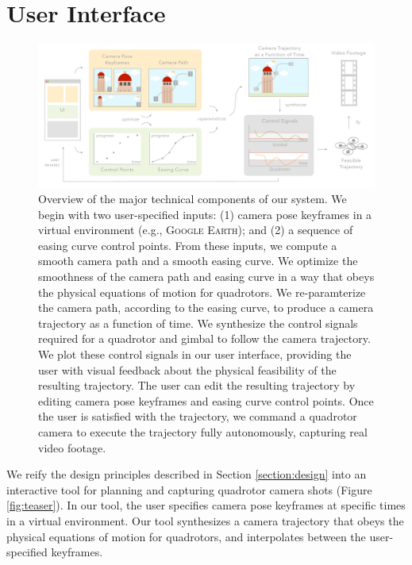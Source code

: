 \section{User Interface}
\label{section:ui}

\begin{figure}[th!]
  \centering
  \includegraphics[width=5.5in]{images/2015_siggraph_asia/system_overview}
  \caption{
Overview of the major technical components of our system.
We begin with two user-specified inputs: (1) camera pose keyframes in a virtual environment (e.g., \textsc{Google Earth}); and (2) a sequence of easing curve control points.
From these inputs, we compute a smooth camera path and a smooth easing curve.
We optimize the smoothness of the camera path and easing curve in a way that obeys the physical equations of motion for quadrotors.
We re-paramterize the camera path, according to the easing curve, to produce a camera trajectory as a function of time.
We synthesize the control signals required for a quadrotor and gimbal to follow the camera trajectory.
We plot these control signals in our user interface, providing the user with visual feedback about the physical feasibility of the resulting trajectory.
The user can edit the resulting trajectory by editing camera pose keyframes and easing curve control points.
Once the user is satisfied with the trajectory, we command a quadrotor camera to execute the trajectory fully autonomously, capturing real video footage.
  }
  \label{figure:overview}
\end{figure}

We reify the design principles described in Section \ref{section:design} into an interactive tool for planning and capturing quadrotor camera shots (Figure \ref{fig:teaser}).
In our tool, the user specifies camera pose keyframes at specific times in a virtual environment.
Our tool synthesizes a camera trajectory that obeys the physical equations of motion for quadrotors, and interpolates between the user-specified keyframes.

